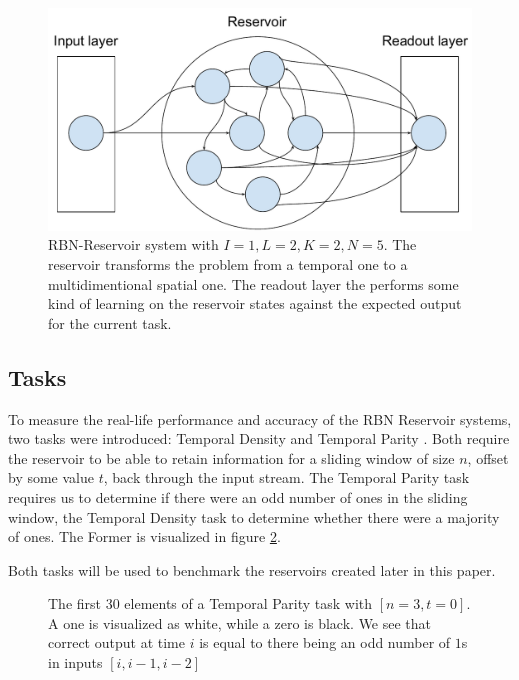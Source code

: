 \begin{figure}
  \centering
  \includegraphics[width=\columnwidth]{background/RBN-Reservoir.pdf}
  \caption{
    RBN-Reservoir system with $I=1, L=2, K=2, N=5$.
    The reservoir transforms the problem from a temporal one to a multidimentional spatial one.
    The readout layer the performs some kind of learning on the reservoir states against the expected output for the current task.}
  \label{figure:rbn-reservoir}
\end{figure}

\subsection{Tasks}
\label{section:tasks}

To measure the real-life performance and accuracy of the RBN Reservoir systems,
two tasks were introduced: Temporal Density and Temporal Parity \cite{rbn-reservoir}.
Both require the reservoir to be able to retain information for a sliding window of size $ n $,
offset by some value $ t $, back through the input stream.
The Temporal Parity task requires us to determine if there were an odd number of ones in the sliding window,
the Temporal Density task to determine whether there were a majority of ones.
The Former is visualized in figure \ref{figure:temporal-parity}.

Both tasks will be used to benchmark the reservoirs created later in this paper.

\begin{figure}


  \caption{
    The first 30 elements of a Temporal Parity task with $[n=3, t=0]$.
    A one is visualized as white, while a zero is black.
    We see that correct output at time $i$ is equal to there being an odd number of $1$s in inputs $[i, i-1, i-2]$
  }
  \label{figure:temporal-parity}
\end{figure}

